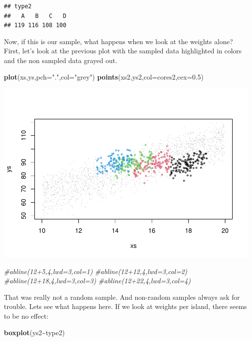 \documentclass[
]{book}
\newenvironment{Shaded}{\begin{snugshade}}{\end{snugshade}}
\newcommand{\AttributeTok}[1]{\textcolor[rgb]{0.13,0.29,0.53}{#1}}
\newcommand{\CommentTok}[1]{\textcolor[rgb]{0.56,0.35,0.01}{\textit{#1}}}
\newcommand{\FloatTok}[1]{\textcolor[rgb]{0.00,0.00,0.81}{#1}}
\newcommand{\FunctionTok}[1]{\textcolor[rgb]{0.13,0.29,0.53}{\textbf{#1}}}
\newcommand{\NormalTok}[1]{#1}
\newcommand{\SpecialCharTok}[1]{\textcolor[rgb]{0.81,0.36,0.00}{\textbf{#1}}}
\newcommand{\StringTok}[1]{\textcolor[rgb]{0.31,0.60,0.02}{#1}}
\begin{document}
\begin{verbatim}
## type2
##   A   B   C   D 
## 119 116 108 100
\end{verbatim}

Now, if this is our sample, what happens when we look at the weights alone? First, let's look at the previous plot with the sampled data highlighted in colors and the non sampled data grayed out.

\begin{Shaded}
\begin{Highlighting}[]
\FunctionTok{plot}\NormalTok{(xs,ys,}\AttributeTok{pch=}\StringTok{"."}\NormalTok{,}\AttributeTok{col=}\StringTok{"grey"}\NormalTok{)}
\FunctionTok{points}\NormalTok{(xs2,ys2,}\AttributeTok{col=}\NormalTok{cores2,}\AttributeTok{cex=}\FloatTok{0.5}\NormalTok{)}
\end{Highlighting}
\end{Shaded}

\includegraphics{ECOMODbook_files/figure-latex/a10.11-1.pdf}

\begin{Shaded}
\begin{Highlighting}[]
\CommentTok{\#abline(12+5,4,lwd=3,col=1)}
\CommentTok{\#abline(12+12,4,lwd=3,col=2)}
\CommentTok{\#abline(12+18,4,lwd=3,col=3)}
\CommentTok{\#abline(12+22,4,lwd=3,col=4)}
\end{Highlighting}
\end{Shaded}

That was really not a random sample. And non-random samples always ask for trouble. Lets see what happens here. If we look at weights per island, there seems to be no effect:

\begin{Shaded}
\begin{Highlighting}[]
\FunctionTok{boxplot}\NormalTok{(ys2}\SpecialCharTok{\textasciitilde{}}\NormalTok{type2)}
\end{Highlighting}
\end{Shaded}
\end{document}
